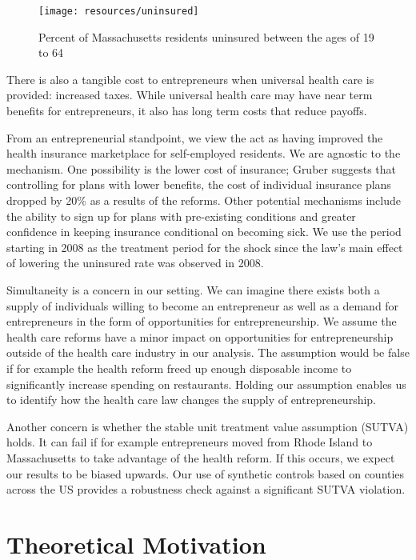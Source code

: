 \documentclass[12pt]{article}
\begin{document}
\begin{figure}[H]
	\centering
	\texttt{[image: resources/uninsured]}
	\caption{Percent of Massachusetts residents uninsured between the ages of 19 to 64}
	\label{fig:uninsuredRate}
\end{figure}

There is also a tangible cost to entrepreneurs when universal health care is provided: increased taxes.  While universal health care may have near term benefits for entrepreneurs, it also has long term costs that reduce payoffs. 

From an entrepreneurial standpoint, we view the act as having improved the health insurance marketplace for self-employed residents. We are agnostic to the mechanism. One possibility is the lower cost of insurance; Gruber \cite{gruber_mass} suggests that controlling for plans with lower benefits, the cost of individual insurance plans dropped by 20\% as a results of the reforms. Other potential mechanisms include the ability to sign up for plans with pre-existing conditions and greater confidence in keeping insurance conditional on becoming sick. We use the period starting in 2008 as the treatment period for the shock since the law's main effect of lowering the uninsured rate was observed in 2008. 

Simultaneity is a concern in our setting. We can imagine there exists both a supply of individuals willing to become an entrepreneur as well as a demand for entrepreneurs in the form of opportunities for entrepreneurship. We assume the health care reforms have a minor impact on opportunities for entrepreneurship outside of the health care industry in our analysis. The assumption would be false if for example the health reform freed up enough disposable income to significantly increase spending on restaurants. Holding our assumption enables us to identify how the health care law changes the supply of entrepreneurship. 

Another concern is whether the stable unit treatment value assumption (SUTVA) holds. It can fail if for example entrepreneurs moved from Rhode Island to Massachusetts to take advantage of the health reform. If this occurs, we expect our results to be biased upwards. Our use of synthetic controls based on counties across the US provides a robustness check against a significant SUTVA violation. 

\section{Theoretical Motivation}
\label{sec:model}
\end{document}
